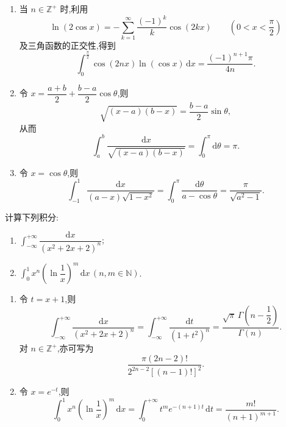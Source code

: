 \begin{solution}
  \leavevmode
  \begin{enumerate}
    \item 当 $n\in\mathbb{Z}^+$ 时,利用
          \[
            \ln(2\cos x)=-\sum\limits_{k=1}^{\infty}\dfrac{(-1)^k}{k}\cos(2kx)
            \qquad\left(0<x<\dfrac{\pi}{2}\right)
          \]
          及三角函数的正交性,得到
          \[
            \displaystyle\int_0^{\frac{\pi}{2}}\cos(2nx)\ln(\cos x)\,\mathrm{d}x
            =\dfrac{(-1)^{n+1}\pi}{4n}.
          \]

    \item 令 $x=\dfrac{a+b}{2}+\dfrac{b-a}{2}\cos\theta$,则
          \[
            \sqrt{(x-a)(b-x)}=\dfrac{b-a}{2}\sin\theta,
          \]
          从而
          \[
            \displaystyle\int_a^b\dfrac{\mathrm{d}x}{\sqrt{(x-a)(b-x)}}
            =\int_0^\pi\mathrm{d}\theta=\pi.
          \]

    \item 令 $x=\cos\theta$,则
          \[
            \displaystyle\int_{-1}^{1}\dfrac{\mathrm{d}x}{(a-x)\sqrt{1-x^2}}
            =\int_0^\pi\dfrac{\mathrm{d}\theta}{a-\cos\theta}
            =\dfrac{\pi}{\sqrt{a^2-1}}.
          \]
  \end{enumerate}
\end{solution}

\begin{example}
  计算下列积分:
  \begin{enumerate}
    \item $\displaystyle\int_{-\infty}^{+\infty}\dfrac{\mathrm{d}x}{(x^2+2x+2)^n}$;
    \item $\displaystyle\int_0^1x^n\left(\ln\dfrac{1}{x}\right)^m\,\mathrm{d}x\,(n,m\in\mathbb{N})$.
  \end{enumerate}
\end{example}
\exampleblank

\begin{solution}
  \leavevmode
  \begin{enumerate}
    \item 令 $t=x+1$,则
          \[
            \displaystyle\int_{-\infty}^{+\infty}\dfrac{\mathrm{d}x}{(x^2+2x+2)^n}
            =\int_{-\infty}^{+\infty}\dfrac{\mathrm{d}t}{(1+t^2)^n}
            =\dfrac{\sqrt{\pi}\,\Gamma\left(n-\dfrac{1}{2}\right)}{\Gamma(n)}.
          \]
          对 $n\in\mathbb{Z}^+$,亦可写为
          \[
            \dfrac{\pi(2n-2)!}{2^{2n-2}[(n-1)!]^2}.
          \]

    \item 令 $x=e^{-t}$,则
          \[
            \displaystyle\int_0^1x^n\left(\ln\dfrac{1}{x}\right)^m\,\mathrm{d}x
            =\int_0^{+\infty}t^m e^{-(n+1)t}\,\mathrm{d}t
            =\dfrac{m!}{(n+1)^{m+1}}.
          \]
  \end{enumerate}
\end{solution}


